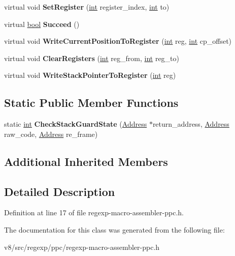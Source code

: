 \begin{DoxyCompactItemize}
virtual void {\bfseries Set\+Register} (\mbox{\hyperlink{classint}{int}} register\+\_\+index, \mbox{\hyperlink{classint}{int}} to)
\item 
\mbox{\label{classv8_1_1internal_1_1RegExpMacroAssemblerPPC_a5a7d439e8bdff381782bec2dcccf7fcd}} 
virtual \mbox{\hyperlink{classbool}{bool}} {\bfseries Succeed} ()
\item 
\mbox{\label{classv8_1_1internal_1_1RegExpMacroAssemblerPPC_a120132768b582cb16b10c0ab6557a67d}} 
virtual void {\bfseries Write\+Current\+Position\+To\+Register} (\mbox{\hyperlink{classint}{int}} reg, \mbox{\hyperlink{classint}{int}} cp\+\_\+offset)
\item 
\mbox{\label{classv8_1_1internal_1_1RegExpMacroAssemblerPPC_aecd6cdb324170c12449e66eb3c4aeefa}} 
virtual void {\bfseries Clear\+Registers} (\mbox{\hyperlink{classint}{int}} reg\+\_\+from, \mbox{\hyperlink{classint}{int}} reg\+\_\+to)
\item 
\mbox{\label{classv8_1_1internal_1_1RegExpMacroAssemblerPPC_a9f4d555029f9d8392ab1c29181ae3a07}} 
virtual void {\bfseries Write\+Stack\+Pointer\+To\+Register} (\mbox{\hyperlink{classint}{int}} reg)
\end{DoxyCompactItemize}
\subsection*{Static Public Member Functions}
\begin{DoxyCompactItemize}
\item 
\mbox{\label{classv8_1_1internal_1_1RegExpMacroAssemblerPPC_a3801eb671db17e1208109f23a271399e}} 
static \mbox{\hyperlink{classint}{int}} {\bfseries Check\+Stack\+Guard\+State} (\mbox{\hyperlink{classuintptr__t}{Address}} $\ast$return\+\_\+address, \mbox{\hyperlink{classuintptr__t}{Address}} raw\+\_\+code, \mbox{\hyperlink{classuintptr__t}{Address}} re\+\_\+frame)
\end{DoxyCompactItemize}
\subsection*{Additional Inherited Members}


\subsection{Detailed Description}


Definition at line 17 of file regexp-\/macro-\/assembler-\/ppc.\+h.



The documentation for this class was generated from the following file\+:\begin{DoxyCompactItemize}
\item 
v8/src/regexp/ppc/regexp-\/macro-\/assembler-\/ppc.\+h\end{DoxyCompactItemize}
